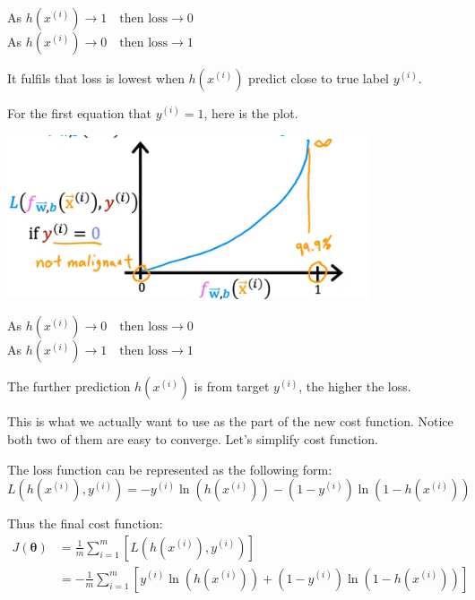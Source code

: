 \documentclass[fontset=windows,pass]{article}
\numberwithin{equation}{subsection} %
\begin{document}
\begin{center}
	As $h(x^{(i)}) \to 1 \quad \text{then loss} \to 0$\\
	As $h(x^{(i)}) \to 0 \quad \text{then loss} \to 1$
\end{center}

It fulfils that loss is lowest when $h(x^{(i)})$ predict close to true label $y^{(i)}$.

For the first equation that $y^{(i)} = 1$, here is the plot.
\begin{center}
	\includegraphics[width = 0.8\textwidth]{Figures/SecondPlot.png}
\end{center}

\begin{center}
	As $h(x^{(i)}) \to 0 \quad \text{then loss} \to 0$\\
	As $h(x^{(i)}) \to 1 \quad \text{then loss} \to 1$
\end{center}

The further prediction $h(x^{(i)})$ is from target $y^{(i)}$, the higher the loss.

This is what we actually want to use as the part of the new cost function. Notice both two of them are easy to converge.
Let's simplify cost function.

The loss function can be represented as the following form:
\begin{equation*}
	L\left(h(x^{(i)}), y^{(i)}\right) = -y^{(i)}\ln(h(x^{(i)})) - (1-y^{(i)})\ln(1-h(x^{(i)}))
\end{equation*}

Thus the final cost function:
\begin{equation}
	\begin{aligned}
	J(\boldsymbol{\theta}) & = \frac{1}{m} \sum_{i=1}^{m} \left[L\left(h(x^{(i)}), y^{(i)}\right)\right] \\
	& = -\frac{1}{m} \sum_{i=1}^{m} \left[y^{(i)}\ln(h(x^{(i)})) + (1-y^{(i)})\ln(1-h(x^{(i)}))\right]
	\end{aligned}
\end{equation}
\end{document}
